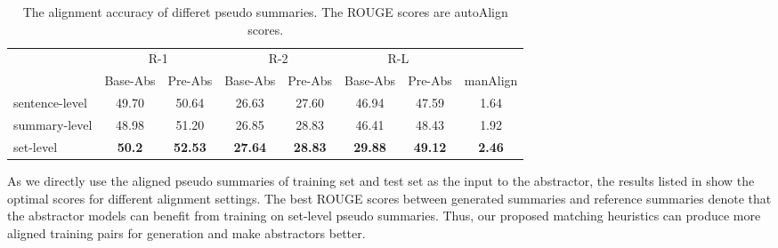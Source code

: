 \begin{table*}[ht!]
	\centering
	\scriptsize
	\begin{tabular}{|l|c|c|c|c|c|c|c|}
		\hline
		\multirow{2}{*}{} &\multicolumn{2}{|c|}{R-1} &\multicolumn{2}{|c|}{R-2}& \multicolumn{2}{|c|}{R-L}&\\ 
		\cline{2-7}
		&  Base-Abs & Pre-Abs & Base-Abs & Pre-Abs & Base-Abs & Pre-Abs & manAlign\\
		\hline
		sentence-level & 49.70 & 50.64 & 26.63 & 27.60 & 46.94 & 47.59 & 1.64 \\
		\hline
		summary-level & 48.98 & 51.20& 26.85 &28.83&46.41&48.43& 1.92\\
		\hline
		set-level & \bf 50.2 & \bf 52.53 & \bf 27.64 & \bf 28.83 & \bf 29.88& \bf 49.12& \bf 2.46 \\
		\hline
	\end{tabular}
	\caption{The alignment accuracy of differet pseudo summaries. The ROUGE scores are autoAlign scores.}
	\label{tab:align}
\end{table*}

As we directly use the aligned pseudo summaries of training set and test set as the input to the abstractor, 
the results listed in  show the optimal scores for different alignment 
settings.
The best ROUGE scores between generated summaries and reference summaries
denote that the abstractor models 
can benefit from training on set-level pseudo summaries.
Thus, our proposed matching heuristics can produce more aligned training pairs
for generation and make abstractors better.



